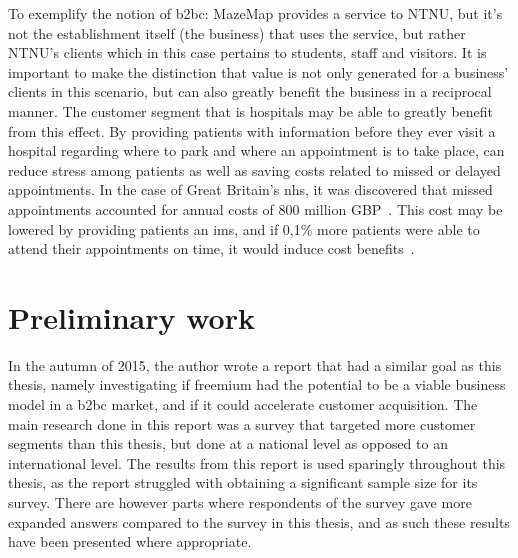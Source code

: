 To exemplify the notion of \gls{b2bc}: MazeMap provides a service to NTNU, but it's not the establishment itself (the business) that uses the service, but rather NTNU's clients which in this case pertains to students, staff and visitors. It is important to make the distinction that value is not only generated for a business' clients in this scenario, but can also greatly benefit the business in a reciprocal manner. The customer segment that is hospitals may be able to greatly benefit from this effect. By providing patients with information before they ever visit a hospital regarding where to park and where an appointment is to take place, can reduce stress among patients as well as saving costs related to missed or delayed appointments. In the case of Great Britain's \gls{nhs}, it was discovered that missed appointments accounted for annual costs of 800 million GBP~\cite{lucyjohnston2012}. This cost may be lowered by providing patients an \gls{ims}, and if 0,1\% more patients were able to attend their appointments on time, it would induce cost benefits~\cite{mazemaphospitals2015}.


\section{Preliminary work}
In the autumn of 2015, the author wrote a report that had a similar goal as this thesis, namely investigating if freemium had the potential to be a viable business model in a \gls{b2bc} market, and if it could accelerate customer acquisition. The main research done in this report was a survey that targeted more customer segments than this thesis, but done at a national level as opposed to an international level. The results from this report is used sparingly throughout this thesis, as the report struggled with obtaining a significant sample size for its survey. There are however parts where respondents of the survey gave more expanded answers compared to the survey in this thesis, and as such these results have been presented where appropriate. 
